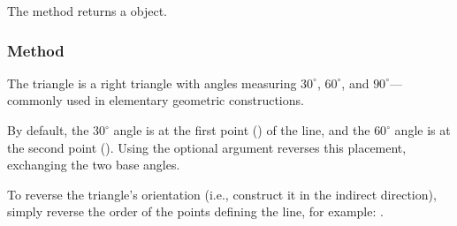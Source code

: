 \medskip
\noindent
The method returns a  object.

\vspace{1em}
\begin{minipage}{.5\textwidth}
\begin{center}
\end{center}
\end{minipage}
\begin{minipage}{.5\textwidth}
\begin{tkzexample}
\end{tkzexample}
\end{minipage}

\subsubsection{Method }
\label{ssub:method_imeth_line_school_swap}
The  triangle is a right triangle with angles measuring $30^\circ$, $60^\circ$, and $90^\circ$—commonly used in elementary geometric constructions.

\medskip
\noindent
By default, the $30^\circ$ angle is at the first point () of the line, and the $60^\circ$ angle is at the second point (). Using the optional argument  reverses this placement, exchanging the two base angles.

\medskip
\noindent
To reverse the triangle’s orientation (i.e., construct it in the indirect direction), simply reverse the order of the points defining the line, for example:
.

